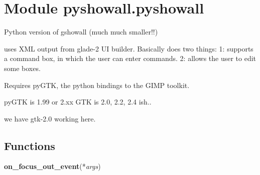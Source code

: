 %
%
%


\section{Module pyshowall.pyshowall}

    \label{pyshowall:pyshowall}
Python version of gshowall (much much smaller!!)

uses XML output from glade-2 UI builder. Basically does two things: 1: 
supports a command box, in which the user can enter commands. 2: allows the
user to edit some boxes.

Requires pyGTK, the python bindings to the GIMP toolkit.

pyGTK is 1.99 or 2.xx GTK is 2.0, 2.2, 2.4 ish..

we have gtk-2.0 working here.



  \subsection{Functions}

    \label{pyshowall:pyshowall:on_focus_out_event}

    \vspace{0.5ex}

    \begin{boxedminipage}{\textwidth}

    \raggedright \textbf{on\_focus\_out\_event}(*\textit{args})

    \end{boxedminipage}

    \label{pyshowall:pyshowall:activatecmd}


